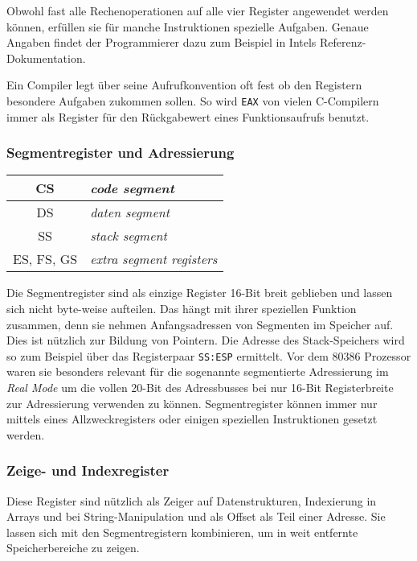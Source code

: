 Obwohl fast alle Rechenoperationen auf alle vier Register angewendet werden können, erfüllen sie für manche Instruktionen spezielle Aufgaben. Genaue Angaben findet der Programmierer dazu zum Beispiel in Intels Referenz-Dokumentation. \cite{intelreferenz}

Ein Compiler legt über seine Aufrufkonvention oft fest ob den Registern besondere Aufgaben zukommen sollen. So wird {\tt EAX} von vielen C-Compilern immer als Register für den Rückgabewert eines Funktionsaufrufs benutzt. \cite{wp:callconv}

\subsubsection{Segmentregister und Adressierung}

\begin{tabular}{|c|l|}
\hline CS & \emph{code segment} \\
\hline DS & \emph{daten segment} \\
\hline SS & \emph{stack segment} \\
\hline ES, FS, GS & \emph {extra segment registers} \\
\hline
\end{tabular}

Die Segmentregister sind als einzige Register 16-Bit breit geblieben und lassen sich nicht byte-weise aufteilen. Das hängt mit ihrer speziellen Funktion zusammen, denn sie nehmen Anfangsadressen von Segmenten im Speicher auf. Dies ist nützlich zur Bildung von Pointern. Die Adresse des Stack-Speichers wird so zum Beispiel über das Registerpaar {\tt SS:ESP} ermittelt. Vor dem 80386 Prozessor waren sie besonders relevant für die sogenannte segmentierte Adressierung im \emph{Real Mode} um die vollen 20-Bit des Adressbusses bei nur 16-Bit Registerbreite zur Adressierung verwenden zu können.
Segmentregister können immer nur mittels eines Allzweckregisters oder einigen speziellen Instruktionen gesetzt werden.


\subsubsection{Zeige- und Indexregister}

Diese Register sind nützlich als Zeiger auf Datenstrukturen, Indexierung in Arrays und bei String-Manipulation und als Offset als Teil einer Adresse. Sie lassen sich mit den Segmentregistern kombinieren, um in weit entfernte Speicherbereiche zu zeigen.

